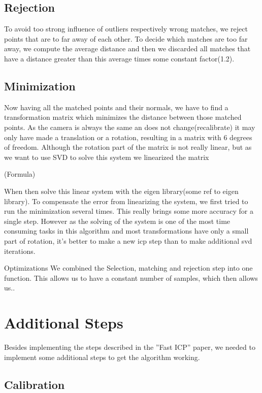 \documentclass[twocolumn]{article}
\begin{document}
\subsection{Rejection}
To avoid too strong influence of outliers respectively wrong matches, we reject points that are to far away of each other. 
To decide which matches are too far away, we compute the average distance and then we discarded all matches that have a distance greater than this average times some constant factor(1.2).

\subsection{Minimization}
\label{minimization}
Now having all the matched points and their normals, we have to find a transformation matrix which minimizes the distance between those matched points.
As the camera is always the same an does not change(recalibrate) it may only have made a translation or a rotation, resulting in a matrix with 6 degrees of freedom.
Although the rotation part of the matrix is not really linear, but as we want to use SVD to solve this system we linearized the matrix

(Formula)

\cite{ptp}

When then solve this linear system with the eigen library(some ref to eigen library).
To compensate the error from linearizing the system, we first tried to run the minimization several times. 
This really brings some more accuracy for a single step. 
However as the solving of the system is one of the most time consuming tasks in this algorithm and most transformations have only a small part of rotation, it's better to make a new icp step than to make additional svd iterations.

Optimizations
We combined the Selection, matching and rejection step into one function. This allows us to have a constant number of samples, which then allows us..

\section{Additional Steps}
Besides implementing the steps described in the ''Fast ICP''\cite{fasticp} paper, we needed to implement some additional steps to get the algorithm working.

\subsection{Calibration}
\end{document}
